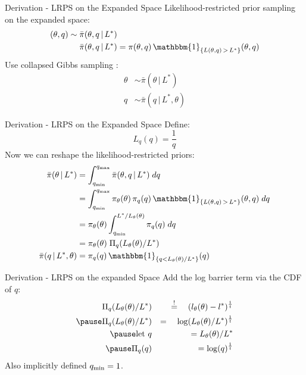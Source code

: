 \documentclass[]{beamer}
\begin{document}
  \begin{frame}{Derivation - LRPS on the Expanded Space}
    Likelihood-restricted prior sampling on the expanded space:
    \begin{align*}
      (\theta,q) \sim \; &\bar{\pi}(\theta, q \,|\, L^*) \\
      &\bar{\pi}(\theta, q \,|\, L^*) = \pi(\theta, q) \, \mathbbm{1}_{\{L(\theta, q) \, > \, L^*\}}(\theta, q)
    \end{align*}
    \pause
    Use collapsed Gibbs sampling \cite{collapsed_gibbs}:
    \begin{align*}
      \theta &\sim  \bar{\pi}(\theta \,|\, L^*) \\
      q &\sim  \bar{\pi}(q \,|\, L^*, \theta)
    \end{align*}
  \end{frame}
  \begin{frame}{Derivation - LRPS on the Expanded Space}
    Define: 
    $$
      L_q(q) = \frac{1}{q}
    $$
    \pause
    Now we can reshape the likelihood-restricted priors:
    \begin{align*}
      \bar{\pi}(\theta \,|\, L^*) &= \int_{q_{\textrm{min}}}^{q_{\textrm{max}}} \bar{\pi}(\theta, q \,|\, L^*) \; dq \\
      &= \int_{q_{\textrm{min}}}^{q_{\textrm{max}}} \pi_\theta(\theta) \, \pi_q(q) \, \mathbbm{1}_{\{L(\theta, q) \,>\, L^*\}}(\theta, q) \; dq \\
      &= \pi_\theta(\theta) \int_{q_{\textrm{min}}}^{L^* / L_\theta(\theta)} \pi_q(q) \; dq \\
      &= \pi_\theta(\theta) \; \Pi_q(L_\theta(\theta) / L^*) \\
      \bar{\pi}(q \,|\, L^*, \theta) &= \pi_q(q) \, \mathbbm{1}_{\{q < L_\theta(\theta) / L^*\}}(q)
    \end{align*}
  \end{frame}
  \begin{frame}{Derivation - LRPS on the expanded Space}
    Add the log barrier term via the CDF of $q$:
    \begin{eqnarray*}
      \Pi_q(L_\theta(\theta) / L^*) && \overset{!}{=} \quad (l_\theta(\theta) - l^*)^{\frac{1}{t}}  \\\pause
      \Pi_q(L_\theta(\theta) / L^*) && = \quad \log(L_\theta(\theta) / L^*)^{\frac{1}{t}} \\\pause
      \textrm{let } q &&= L_\theta(\theta) / L^* \\\pause
      \Pi_q(q) &&= \log(q)^{\frac{1}{t}} 
    \end{eqnarray*}
    Also implicitly defined $q_{\textnormal{min}} = 1$.
  \end{frame}
\end{document}
